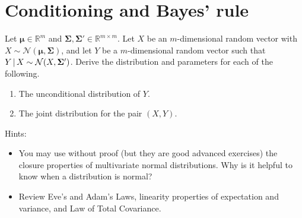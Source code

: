 \documentclass[submit]{harvardml}
\newcommand{\R}{\mathbb{R}}
\renewcommand{\v}[1]{\mathbf{#1}}
\begin{document}
\section*{Conditioning and Bayes' rule}
\begin{problem}
  Let $\v \mu \in \R^m$ and
  $\v \Sigma, \v \Sigma' \in \R^{m \times m}$.  Let $X$ be an
  $m$-dimensional random vector with
  $X \sim \mathcal{N}(\v \mu, \v \Sigma)$, and let $Y$ be a
  $m$-dimensional random vector such that
  $Y \given X \sim \mathcal{N}(X, \v \Sigma')$. Derive the
  distribution and parameters for each of the following.

\begin{enumerate}[label=(\alph*)]
  \item The unconditional distribution of $Y$.

  \item The joint distribution for the pair $(X,Y)$.

\end{enumerate}

Hints:
\begin{itemize}
\item You may use without proof (but they are good advanced exercises)
  the closure properties of multivariate normal distributions. Why is
  it helpful to know when a distribution is normal?
\item Review Eve's and Adam's Laws, linearity properties of
  expectation and variance, and Law of Total Covariance.

\end{itemize}

\end{problem}
\end{document}
